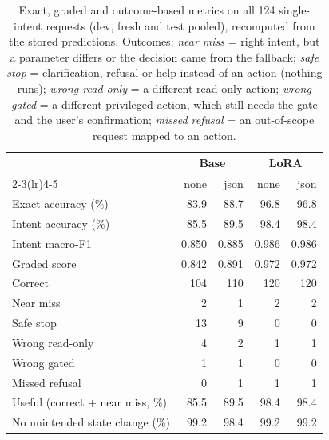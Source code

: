 \documentclass[10pt,twocolumn,letterpaper]{article}
\theoremstyle{definition}
\begin{document}
\begin{table}[t]
\centering\small
\caption{Exact, graded and outcome-based metrics on all 124 single-intent requests (dev, fresh and
test pooled), recomputed from the stored predictions. Outcomes: \emph{near miss} = right intent,
but a parameter differs or the decision came from the fallback; \emph{safe stop} = clarification, refusal or help instead of an action
(nothing runs); \emph{wrong read-only} = a different read-only action; \emph{wrong gated} = a
different privileged action, which still needs the gate and the user's confirmation; \emph{missed
refusal} = an out-of-scope request mapped to an action.}
\label{tab:outcomes}
\setlength{\tabcolsep}{3pt}
\begin{tabular}{@{}lrrrr@{}}
\toprule
 & \multicolumn{2}{c}{Base} & \multicolumn{2}{c}{LoRA} \\
\cmidrule(lr){2-3}\cmidrule(lr){4-5}
 & none & json & none & json \\
\midrule
Exact accuracy (\%) & 83.9 & 88.7 & 96.8 & 96.8 \\
Intent accuracy (\%) & 85.5 & 89.5 & 98.4 & 98.4 \\
Intent macro-F1 & 0.850 & 0.885 & 0.986 & 0.986 \\
Graded score & 0.842 & 0.891 & 0.972 & 0.972 \\
\midrule
Correct & 104 & 110 & 120 & 120 \\
Near miss & 2 & 1 & 2 & 2 \\
Safe stop & 13 & 9 & 0 & 0 \\
Wrong read-only & 4 & 2 & 1 & 1 \\
Wrong gated & 1 & 1 & 0 & 0 \\
Missed refusal & 0 & 1 & 1 & 1 \\
\midrule
Useful (correct + near miss, \%) & 85.5 & 89.5 & 98.4 & 98.4 \\
No unintended state change (\%) & 99.2 & 98.4 & 99.2 & 99.2 \\
\bottomrule
\end{tabular}
\end{table}
\end{document}
